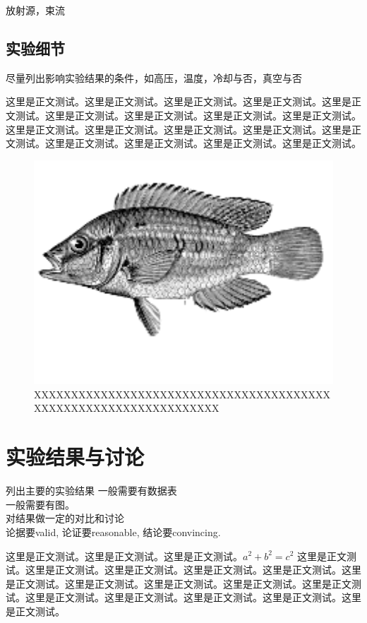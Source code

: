 \documentclass[prc,twocolumn,superscriptaddress,showkeys,showpacs,amssymb,amsmath,amsfonts,aps]{revtex4}
\begin{document}
放射源，束流

\subsection{实验细节}
尽量列出影响实验结果的条件，如高压，温度，冷却与否，真空与否

这里是正文测试。这里是正文测试。这里是正文测试。这里是正文测试。这里是正文测试。这里是正文测试。这里是正文测试。这里是正文测试。这里是正文测试。这里是正文测试。这里是正文测试。这里是正文测试。这里是正文测试。这里是正文测试。这里是正文测试。这里是正文测试。这里是正文测试。这里是正文测试。
\begin{figure}[htp]
\begin{center}
\includegraphics[width=11.5cm]{fish.png}
\vspace{-0.1cm}
\caption{XXXXXXXXXXXXXXXXXXXXXXXXXXXXXXXXXXXXXXXXXXXXXXXXXXXXXXXXXXXXXXXXX} 
\label{isochan}
\end{center}
\end{figure}
\section{实验结果与讨论}%
列出主要的实验结果
一般需要有数据表\\
一般需要有图。\\
对结果做一定的对比和讨论\\

论据要valid, 论证要reasonable, 结论要convincing.

这里是正文测试。这里是正文测试。这里是正文测试。$a^2+b^2=c^2$ 这里是正文测试。这里是正文测试。这里是正文测试。这里是正文测试。这里是正文测试。这里是正文测试。这里是正文测试。这里是正文测试。这里是正文测试。这里是正文测试。这里是正文测试。这里是正文测试。这里是正文测试。这里是正文测试。这里是正文测试。
\end{document}
